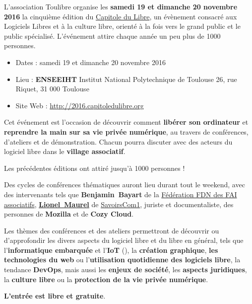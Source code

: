 
\Separateur
\par{\fontsize{14pt}{22pt}\selectfont
  L'association Toulibre organise les \textbf{samedi 19 et dimanche 20 novembre 2016} la cinquième
  édition du \href{http://capitoledulibre.org}{Capitole du Libre},
  un évènement consacré aux Logiciels Libres et à la culture libre,
  orienté à la fois vers le grand public et le public spécialisé.
  L'événement attire chaque année un peu plus de 1000 personnes.
}

\begin{itemize}[label=$\bullet$]
\item Dates : samedi 19 et dimanche 20 novembre 2016
\item Lieu : \textbf{ENSEEIHT} Institut National Polytechnique de Toulouse
26, rue Riquet, 31 000 Toulouse
\item Site Web : \href{http://capitoledulibre.org}{http://2016.capitoledulibre.org}
\end{itemize}

\Separateur

Cet événement est l'occasion de découvrir comment \textbf{libérer son ordinateur}
et \textbf{reprendre la main sur sa vie privée numérique},
au travers de conférences, d'ateliers et de démonstration.
Chacun pourra discuter avec des acteurs du logiciel libre dans le \textbf{village associatif}.

Les précédentes éditions ont attiré jusqu'à 1000 personnes !

\Separateur

Des cycles de conférences thématiques auront lieu durant tout le weekend,
avec des intervenants tels que \textbf{\mbox{Benjamin Bayart}} de la \href{http://ffdn.org/}{Fédération FDN des FAI associatifs},
\textbf{\href{http://scinfolex.com/}{\mbox{Lionel Maurel}}} de \href{http://savoirscom1.info/}{SavoirsCom1}, juriste et documentaliste,
des personnes de \textbf{Mozilla} et de \textbf{Cozy Cloud}.

\Separateur

Les thèmes des conférences et des ateliers permettront de découvrir ou d'approfondir
les divers aspects du logiciel libre et du libre en général, tels que 
l'\textbf{informatique embarquée} et l'\textbf{IoT} (), la \textbf{création graphique},
\textbf{les technologies du web} ou l'\textbf{utilisation quotidienne des logiciels libre}, la tendance \textbf{DevOps},
mais aussi les \textbf{enjeux de société}, les \textbf{aspects juridiques},
la \textbf{culture libre} ou la \textbf{protection de la vie privée numérique}.

\Separateur

\textbf{L'entrée est libre et gratuite}.

